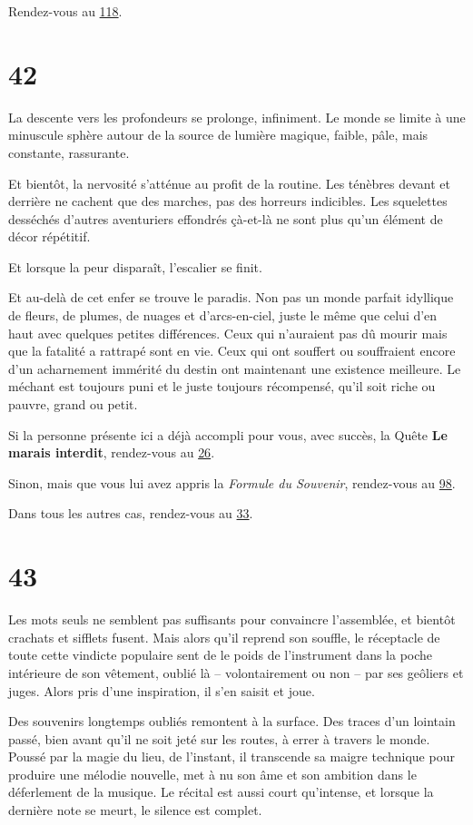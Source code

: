 \documentclass{report}
\newcommand{\gsection}[1]{
    \section{#1}
    \label{section-#1}
}
\newcommand{\glink}[1]{\hyperref[section-#1]{#1}}
\begin{document}
Rendez-vous au \glink{118}.

\gsection{42}

La descente vers les profondeurs se prolonge, infiniment. Le monde se limite à une minuscule sphère autour de la source de lumière magique, faible, pâle, mais constante, rassurante.

Et bientôt, la nervosité s'atténue au profit de la routine. Les ténèbres devant et derrière ne cachent que des marches, pas des horreurs indicibles. Les squelettes desséchés d'autres aventuriers effondrés çà-et-là ne sont plus qu'un élément de décor répétitif.

Et lorsque la peur disparaît, l'escalier se finit.

Et au-delà de cet enfer se trouve le paradis. Non pas un monde parfait idyllique de fleurs, de plumes, de nuages et d'arcs-en-ciel, juste le même que celui d'en haut avec quelques petites différences. Ceux qui n'auraient pas dû mourir mais que la fatalité a rattrapé sont en vie. Ceux qui ont souffert ou souffraient encore d'un acharnement immérité du destin ont maintenant une existence meilleure. Le méchant est toujours puni et le juste toujours récompensé, qu'il soit riche ou pauvre, grand ou petit.

Si la personne présente ici a déjà accompli pour vous, avec succès, la Quête \textbf{Le marais interdit}, rendez-vous au \glink{26}.

Sinon, mais que vous lui avez appris la \emph{Formule du Souvenir}, rendez-vous au \glink{98}.

Dans tous les autres cas, rendez-vous au \glink{33}.

\gsection{43}

Les mots seuls ne semblent pas suffisants pour convaincre l'assemblée, et bientôt crachats et sifflets fusent. Mais alors qu'il reprend son souffle, le réceptacle de toute cette vindicte populaire sent de le poids de l'instrument dans la poche intérieure de son vêtement, oublié là – volontairement ou non – par ses geôliers et juges. Alors pris d'une inspiration, il s'en saisit et joue.

Des souvenirs longtemps oubliés remontent à la surface. Des traces d'un lointain passé, bien avant qu'il ne soit jeté sur les routes, à errer à travers le monde. Poussé par la magie du lieu, de l'instant, il transcende sa maigre technique pour produire une mélodie nouvelle, met à nu son âme et son ambition dans le déferlement de la musique. Le récital est aussi court qu'intense, et lorsque la dernière note se meurt, le silence est complet.
\end{document}
